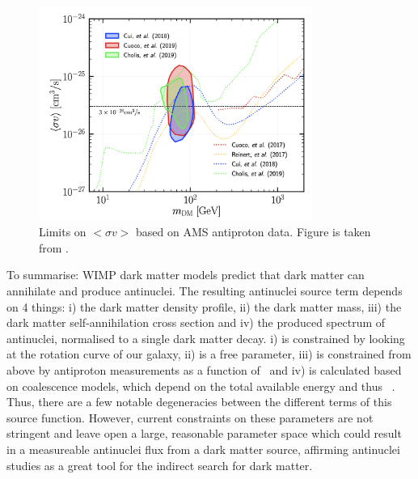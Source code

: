 \begin{figure}
    \centering
    \includegraphics[width=0.8\textwidth]{figures/PbarLimitsAMS.png}
    \caption{Limits on  $<\sigma v>$ based on AMS antiproton data. Figure is taken from \cite{Doetinchem_2020_review}.}
    \label{fig:DMSigmaVLimits}
\end{figure}

To summarise: WIMP dark matter models predict that dark matter can annihilate and produce antinuclei. The resulting antinuclei source term depends on 4 things: i) the dark matter density profile, ii) the dark matter mass, iii) the dark matter self-annihilation cross section and iv) the produced spectrum of antinuclei, normalised to a single dark matter decay. i) is constrained by looking at the rotation curve of our galaxy, ii) is a free parameter, iii) is constrained from above by antiproton measurements as a function of \dmm\ and iv) is calculated based on coalescence models, which depend on the total available energy and thus \dmm\ . Thus, there are a few notable degeneracies between the different terms of this source function. However, current constraints on these parameters are not stringent and leave open a large, reasonable parameter space which could result in a measureable antinuclei flux from a dark matter source, affirming antinuclei studies as a great tool for the indirect search for dark matter.



